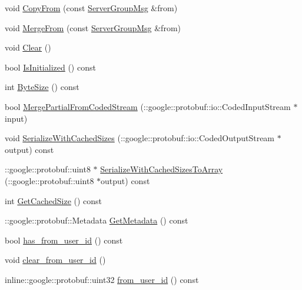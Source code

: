 \begin{DoxyCompactItemize}
void \hyperlink{class_i_m_1_1_base_define_1_1_server_group_msg_a45ae711e9650e0ae0c8915603bdc634a}{Copy\+From} (const \hyperlink{class_i_m_1_1_base_define_1_1_server_group_msg}{Server\+Group\+Msg} \&from)
\item 
void \hyperlink{class_i_m_1_1_base_define_1_1_server_group_msg_a8d1d842fed86319030ee4b3b0016703c}{Merge\+From} (const \hyperlink{class_i_m_1_1_base_define_1_1_server_group_msg}{Server\+Group\+Msg} \&from)
\item 
void \hyperlink{class_i_m_1_1_base_define_1_1_server_group_msg_a6978834db8f1dec35023a5d582032254}{Clear} ()
\item 
bool \hyperlink{class_i_m_1_1_base_define_1_1_server_group_msg_a31adff05964d4e56f5ad85297b7eaa92}{Is\+Initialized} () const 
\item 
int \hyperlink{class_i_m_1_1_base_define_1_1_server_group_msg_ab9f18f9b51073487cf712f1047b9c0d6}{Byte\+Size} () const 
\item 
bool \hyperlink{class_i_m_1_1_base_define_1_1_server_group_msg_a7cc0db289be827aefd36615697a67e1a}{Merge\+Partial\+From\+Coded\+Stream} (\+::google\+::protobuf\+::io\+::\+Coded\+Input\+Stream $\ast$input)
\item 
void \hyperlink{class_i_m_1_1_base_define_1_1_server_group_msg_a9d5fa68216683d1fb7245a82d5e702a1}{Serialize\+With\+Cached\+Sizes} (\+::google\+::protobuf\+::io\+::\+Coded\+Output\+Stream $\ast$output) const 
\item 
\+::google\+::protobuf\+::uint8 $\ast$ \hyperlink{class_i_m_1_1_base_define_1_1_server_group_msg_ae3e729054101e9d288f4de272b29ab7e}{Serialize\+With\+Cached\+Sizes\+To\+Array} (\+::google\+::protobuf\+::uint8 $\ast$output) const 
\item 
int \hyperlink{class_i_m_1_1_base_define_1_1_server_group_msg_a2a83f59990fed25dee39494f945f210d}{Get\+Cached\+Size} () const 
\item 
\+::google\+::protobuf\+::\+Metadata \hyperlink{class_i_m_1_1_base_define_1_1_server_group_msg_a69b44dee554273d45b0892833781f72a}{Get\+Metadata} () const 
\item 
bool \hyperlink{class_i_m_1_1_base_define_1_1_server_group_msg_a98663edd2e2082b1b669c75bbcce17f2}{has\+\_\+from\+\_\+user\+\_\+id} () const 
\item 
void \hyperlink{class_i_m_1_1_base_define_1_1_server_group_msg_a4b18853c5c224f7585bf89d06ad2e891}{clear\+\_\+from\+\_\+user\+\_\+id} ()
\item 
inline\+::google\+::protobuf\+::uint32 \hyperlink{class_i_m_1_1_base_define_1_1_server_group_msg_ad76f076f906854a0abc59f30d9e2502e}{from\+\_\+user\+\_\+id} () const 

\end{DoxyCompactItemize}
